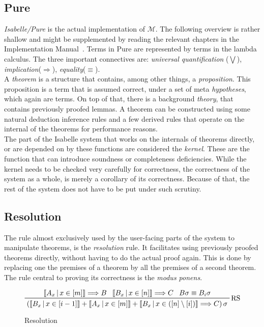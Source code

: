 \subsection{Pure}
\textit{Isabelle/Pure} is the actual implementation of $\mathcal{M}$. The following overview is rather shallow and might be supplemented by reading the relevant chapters in the Implementation Manual~\parencite{implementation}. Terms in Pure are represented by terms in the lambda calculus. The three important connectives are: \textit{universal quantification} ($\bigvee$), \textit{implication}($\Longrightarrow$), \textit{equality}($\equiv$).\\
A \textit{theorem} is a structure that contains, among other things, a \textit{proposition}. This proposition is a term that is assumed correct, under a set of meta \textit{hypotheses}, which again are terms. On top of that, there is a background \textit{theory}, that contains previously proofed lemmas. A theorem can be constructed using some natural deduction inference rules and a few derived rules that operate on the internal of the theorems for performance reasons.\\
The part of the Isabelle system that works on the internals of theorems directly, or are depended on by these functions are considered the \textit{kernel}. These are the function that can introduce soundness or completeness deficiencies. While the kernel needs to be checked very carefully for correctness, the correctness of the system as a whole, is merely a corollary of its correctness. Because of that, the rest of the system does not have to be put under such scrutiny.
\subsection{Resolution}
The rule almost exclusively used by the user-facing parts of the system to manipulate theorems, is the \textit{resolution} rule. It facilitates using previously proofed theorems directly, without having to do the actual proof again. This is done by replacing one the premises of a theorem by all the premises of a second theorem. The rule central to proving its correctness is the \textit{modus ponens}.
\begin{figure}[ht]
\begin{displaymath}
    \prftree[r]{RS}
    {\left\llbracket A_x\,\middle|\, x \in \left[ m \right] \right\rrbracket \Longrightarrow B}
    {\left\llbracket B_x\,\middle|\, x \in \left[ n \right] \right\rrbracket \Longrightarrow C}
    {B\sigma \equiv B_i\sigma}
    {\left( \left\llbracket B_x\,\middle|\, x \in \left[ i - 1 \right] \right\rrbracket
    + \left\llbracket A_x\,\middle|\, x \in \left[ m \right] \right\rrbracket
    + \left\llbracket B_x\,\middle|\, x \in \left( \left[ n \right] \setminus \left[ i \right] \right) \right\rrbracket
    \Longrightarrow C \right) \sigma
    }
\end{displaymath}
\caption{Resolution}
\label{fig:res}
\end{figure}

